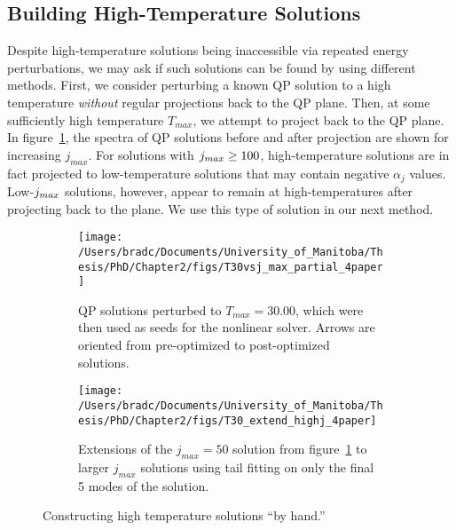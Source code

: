 \documentclass[../PhD.tex]{subfiles}
\begin{document}
\subsection{Building High-Temperature Solutions}
\label{ssec: by hand highT}

Despite high-temperature solutions being inaccessible via repeated energy perturbations, we may ask if such solutions can be found by using different methods. First, we consider perturbing a known QP solution to a high temperature \emph{without} regular projections back to the QP plane. Then, at some sufficiently high temperature $T_{max}$, we attempt to project back to the QP plane. In figure~\ref{fig: T30 vs j_max}, the spectra of QP solutions before and after projection are shown for increasing $j_{max}$. For solutions with $j_{max} \geq 100$, high-temperature solutions are in fact projected to low-temperature solutions that may contain negative $\alpha_j$ values. Low-$j_{max}$ solutions, however, appear to remain at high-temperatures after projecting back to the plane. We use this type of solution in our next method.

\begin{figure}[h]
	\centering
	\begin{subfigure}[t]{0.45\textwidth}
		\texttt{[image: /Users/bradc/Documents/University\_of\_Manitoba/Thesis/PhD/Chapter2/figs/T30vsj\_max\_partial\_4paper]}
		\caption{QP solutions perturbed to $T_{max}=30.00$, which were then used as seeds for the nonlinear solver. Arrows are oriented from pre-optimized to post-optimized solutions.}
		\label{fig: T30 vs j_max}
	\end{subfigure}
	\;
	\begin{subfigure}[t]{0.45\textwidth}
		\texttt{[image: /Users/bradc/Documents/University\_of\_Manitoba/Thesis/PhD/Chapter2/figs/T30\_extend\_highj\_4paper]}
		\caption{Extensions of the $j_{max}=50$ solution from figure~\ref{fig: T30 vs j_max} to larger $j_{max}$ solutions using tail fitting on only the final 5 modes of the solution.}
		\label{fig: manual highT}
	\end{subfigure}
	\caption{Constructing high temperature solutions ``by hand.''}
	\label{fig: making highT}
\end{figure}
\end{document}
